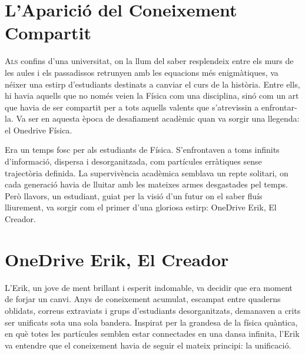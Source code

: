 \chapter{L'Aparició del Coneixement Compartit}


\lettrine[loversize=0.2, lines=2]{A}{ls} confins d'una universitat, on la llum del saber resplendeix entre els murs de les aules i els passadissos retrunyen amb les equacions més enigmàtiques, va néixer una estirp d'estudiants destinats a canviar el curs de la història. Entre ells, hi havia aquells que no només veien la Física com una disciplina, sinó com un art que havia de ser compartit per a tots aquells valents que s'atrevissin a enfrontar-la. Va ser en aquesta època de desafiament acadèmic quan va sorgir una llegenda: el Onedrive Física.

Era un temps fosc per als estudiants de Física. S'enfrontaven a toms infinits d'informació, dispersa i desorganitzada, com partícules erràtiques sense trajectòria definida. La supervivència acadèmica semblava un repte solitari, on cada generació havia de lluitar amb les mateixes armes desgastades pel temps. Però llavors, un estudiant, guiat per la visió d'un futur on el saber fluís lliurement, va sorgir com el primer d'una gloriosa estirp: OneDrive Erik, El Creador.

\chapter{OneDrive Erik, El Creador}


\lettrine[loversize=0.2, lines=2]{L'}{}Erik, un jove de ment brillant i esperit indomable, va decidir que era moment de forjar un canvi. Anys de coneixement acumulat, escampat entre quaderns oblidats, correus extraviats i grups d'estudiants desorganitzats, demanaven a crits ser unificats sota una sola bandera. Inspirat per la grandesa de la física quàntica, en què totes les partícules semblen estar connectades en una dansa infinita, l'Erik va entendre que el coneixement havia de seguir el mateix principi: la unificació.

